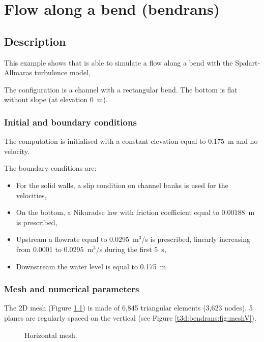 \chapter{Flow along a bend (bendrans)}

\section{Description}

This example shows that  is able to simulate a flow along
a bend with the Spalart-Allmaras turbulence model,

The configuration is a channel with a rectangular bend.
The bottom is flat without slope (at elevation 0~m).

\subsection{Initial and boundary conditions}

The computation is initialised with a constant elevation equal to 0.175~m
and no velocity.

The boundary conditions are:
\begin{itemize}
\item For the solid walls, a slip condition on channel banks is used for the
velocities,
\item On the bottom, a Nikuradse law with friction coefficient equal to
0.00188~m is prescribed,
\item Upstream a flowrate equal to 0.0295~m$^3$/s is prescribed,
linearly increasing from 0.0001 to 0.0295~m$^3$/s during the first 5~s,
\item Downstream the water level is equal to 0.175~m.
\end{itemize}

\subsection{Mesh and numerical parameters}

The 2D mesh (Figure \ref{t3d:bendrans:fig:meshH})
is made of 6,845 triangular elements (3,623 nodes).
5 planes are regularly spaced on the vertical (see Figure \ref{t3d:bendrans:fig:meshV}).

\begin{figure}[!htbp]
 \centering
 \caption{Horizontal mesh.}
 \label{t3d:bendrans:fig:meshH}
\end{figure}

